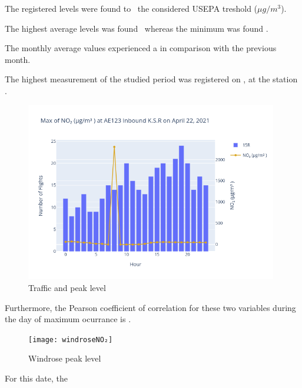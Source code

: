 \documentclass[12pt, oneside]{book}
\begin{document}
The registered  levels were found to \tresholdNOtwo\ the considered USEPA treshold (\limitNOtwo $\mu g/m^3$).

The highest average  levels was found \maxDailyNOtwo\ whereas the minimum was found \minDailyNOtwo.

The monthly average values experienced a \monthChangeNOtwo in comparison with the previous month.


The highest measurement of the studied period was registered on  \dayMaxNOtwo , at the station \stationMaxNOtwo.

{\begin{figure}[H]
\centering
\includegraphics[width=0.98\textwidth]{image11}
\caption{Traffic and  peak level}\label{image11}
\end{figure}}{}

Furthermore, the Pearson coefficient of correlation for these two variables during the day of maximum ocurrance is \correlOthree .  

{\begin{figure}[H]
\centering
	\texttt{[image: windroseNO₂]}
\caption{Windrose  peak level}\label{windroseNO2}
\end{figure}}{}

For this date, the \windNOtwo


\section{}
\end{document}
